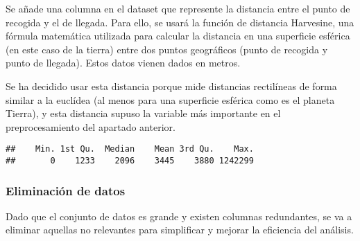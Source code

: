 \documentclass[
]{article}
\newenvironment{Shaded}{\begin{snugshade}}{\end{snugshade}}
\newcommand{\AttributeTok}[1]{\textcolor[rgb]{0.77,0.63,0.00}{#1}}
\newcommand{\CommentTok}[1]{\textcolor[rgb]{0.56,0.35,0.01}{\textit{#1}}}
\newcommand{\FunctionTok}[1]{\textcolor[rgb]{0.00,0.00,0.00}{#1}}
\newcommand{\NormalTok}[1]{#1}
\newcommand{\OtherTok}[1]{\textcolor[rgb]{0.56,0.35,0.01}{#1}}
\newcommand{\SpecialCharTok}[1]{\textcolor[rgb]{0.00,0.00,0.00}{#1}}
\begin{document}
Se añade una columna en el dataset que represente la distancia entre el
punto de recogida y el de llegada. Para ello, se usará la función de
distancia Harvesine, una fórmula matemática utilizada para calcular la
distancia en una superficie esférica (en este caso de la tierra) entre
dos puntos geográficos (punto de recogida y punto de llegada). Estos
datos vienen dados en metros.

Se ha decidido usar esta distancia porque mide distancias rectilíneas de
forma similar a la euclídea (al menos para una superficie esférica como
es el planeta Tierra), y esta distancia supuso la variable más
importante en el preprocesamiento del apartado anterior.

\begin{Shaded}
\end{Shaded}

\begin{verbatim}
##    Min. 1st Qu.  Median    Mean 3rd Qu.    Max. 
##       0    1233    2096    3445    3880 1242299
\end{verbatim}

\hypertarget{eliminaciuxf3n-de-datos}{%
\subsubsection{Eliminación de datos}\label{eliminaciuxf3n-de-datos}}

Dado que el conjunto de datos es grande y existen columnas redundantes,
se va a eliminar aquellas no relevantes para simplificar y mejorar la
eficiencia del análisis.
\end{document}
